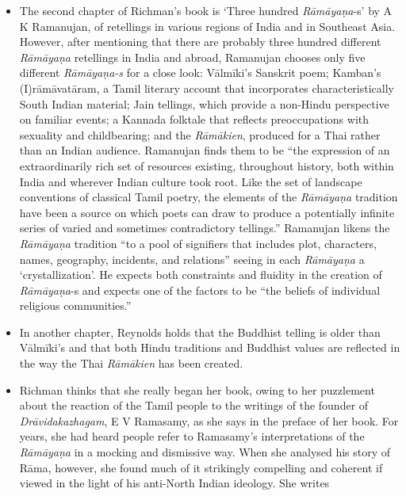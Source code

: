 \begin{itemize}
\item The second chapter of Richman’s book is ‘Three hundred \textit{Rāmāyaṇa}-s’ by A K Ramanujan, of retellings in various regions of India and in Southeast Asia. However, after mentioning that there are probably three hundred different \textit{Rāmāyaṇa } retellings in India and abroad, Ramanujan chooses only five different \textit{Rāmāyaṇa-s} for a close look: Vālmīki's Sanskrit poem; Kamban's (I)rāmāvatāram, a Tamil literary account that incorporates characteristically South Indian material; Jain tellings, which provide a non-Hindu perspective on familiar events; a Kannada folktale that reflects preoccupations with sexuality and childbearing; and the \textit{Rāmākien}, produced for a Thai rather than an Indian audience. Ramanujan finds them to be “the expression of an extraordinarily rich set of resources existing, throughout history, both within India and wherever Indian culture took root. Like the set of landscape conventions of classical Tamil poetry, the elements of the \textit{Rāmāyaṇa} tradition have been a source on which poets can draw to produce a potentially infinite series of varied and sometimes contradictory tellings.” Ramanujan likens the \textit{Rāmāyaṇa} tradition “to a pool of signifiers that includes plot, characters, names, geography, incidents, and relations” seeing in each \textit{Rāmāyaṇa} a ‘crystallization’. He expects both constraints and fluidity in the creation of \textit{Rāmāyaṇa}-s and expects one of the factors to be “the beliefs of individual religious communities.”

 \item In another chapter, Reynolds holds that the Buddhist telling is older than Vālmīki’s and that both Hindu traditions and Buddhist values are reflected in the way the Thai \textit{Rāmākien} has been created.

 \item Richman thinks that she really began her book, owing to her puzzlement about the reaction of the Tamil people to the writings of the founder of \textit{Drāvidakazhagam}, E V Ramasamy, as she says in the preface of her book. For years, she had heard people refer to Ramasamy’s interpretations of the \textit{Rāmāyaṇa} in a mocking and dismissive way. When she analysed his story of Rāma, however, she found much of it strikingly compelling and coherent if viewed in the light of his anti-North Indian ideology. She writes

\end{itemize}

